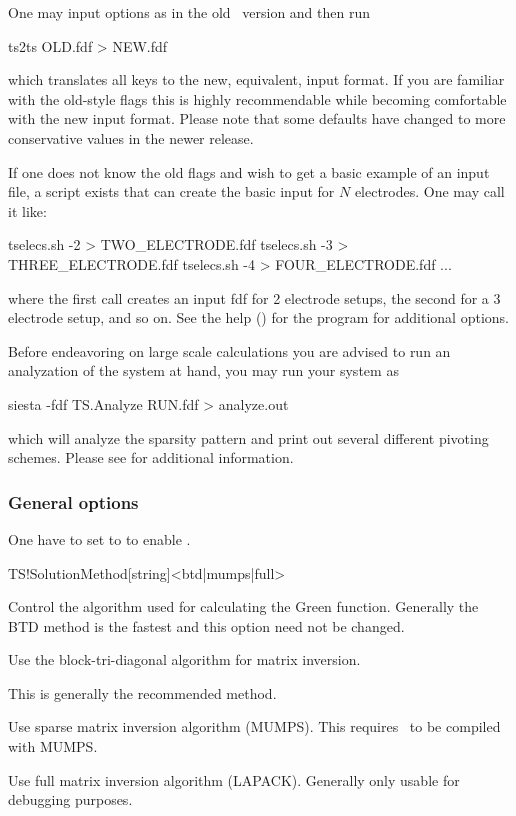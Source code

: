 %
One may input options as in the old \tsiesta\ version and then run
\begin{fdfexample}
  ts2ts OLD.fdf > NEW.fdf
\end{fdfexample}
which translates all keys to the new, equivalent, input format. If you
are familiar with the old-style flags this is highly recommendable
while becoming comfortable with the new input format. Please note that
some defaults have changed to more conservative values in the newer
release.

If one does not know the old flags and wish to get a basic example of
an input file, a script  exists that can
create the basic input for $N$ electrodes. One may call it like:
\begin{shellexample}
  tselecs.sh -2 > TWO_ELECTRODE.fdf
  tselecs.sh -3 > THREE_ELECTRODE.fdf
  tselecs.sh -4 > FOUR_ELECTRODE.fdf
  ...
\end{shellexample}
where the first call creates an input fdf for 2 electrode setups, the
second for a 3 electrode setup, and so on. See the help ()
for the program for additional options.

Before endeavoring on large scale calculations you are advised to run
an analyzation of the system at hand, you may run your system as
\begin{shellexample}
  siesta -fdf TS.Analyze RUN.fdf > analyze.out
\end{shellexample}
which will analyze the sparsity pattern and print out several
different pivoting schemes. Please see  for additional
information.


\subsubsection{General options}

One have to set  to  to enable
\tsiesta.

\begin{fdfentry}{TS!SolutionMethod}[string]<btd|mumps|full>

  Control the algorithm used for calculating the Green
  function. Generally the BTD method is the fastest and this option
  need not be changed.

  \begin{fdfoptions}
    \option[BTD]%
    Use the block-tri-diagonal algorithm for matrix inversion.

    This is generally the recommended method.

    \option[MUMPS]%
    Use sparse matrix inversion algorithm (MUMPS). This requires
    \tsiesta\ to be compiled with MUMPS.

    \option[full]%
    Use full matrix inversion algorithm (LAPACK). Generally only
    usable for debugging purposes.
    
  \end{fdfoptions}
  
\end{fdfentry}

